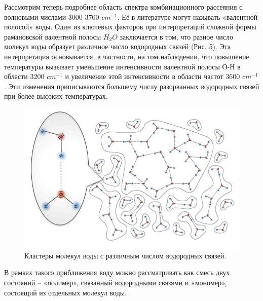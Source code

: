 \documentclass[a4paper,12pt]{article} %
\begin{document}
Рассмотрим теперь подробнее область спектра комбинационного рассеяния с волновыми числами 3000-3700 ${cm}^{-1}$. Её в литературе могут называть «валентной полосой» воды. Один из ключевых факторов при интерпретаций сложной формы
рамановской валентной полосы $H_2O$ заключается в том, что разное число молекул воды образует различное число водородных связей (Рис. 5). Эта интерпретация основывается, в частности, на том наблюдении, что повышение температуры вызывает уменьшение интенсивности валентной полосы О-Н в области 3200 ${cm}^{-1}$ и увеличение этой интенсивности в области частот 3600 ${cm}^{-1}$. Эти изменения приписываются большему числу разорванных водородных связей при более высоких температурах.
\begin{figure}[h!]
    \centering
    \includegraphics[scale=0.6]{разные водор связи.png}
    \caption{Кластеры молекул воды с различным числом водородных связей.}
    \label{Ber}
\end{figure}

В рамках такого приближения воду можно рассматривать как смесь двух состояний – «полимер», связанный водородными связями и «мономер», состоящий из отдельных молекул воды.
\end{document}
